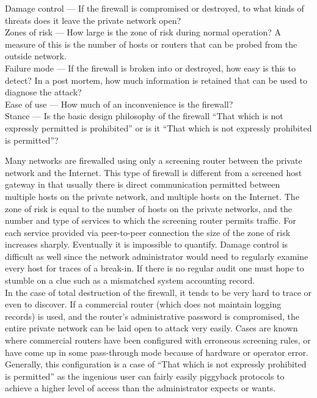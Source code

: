 \begin{htmllist}
\begin{htmllist}
    Damage control --- If the firewall is compromised or destroyed, to what
    kinds of threats does it leave the private network open?\\
    
    Zones of risk --- How large is the zone of risk during normal
    operation?  A measure of this is the number of hosts or routers that
    can be probed
    from the outside network.\\

    Failure mode --- If the firewall is broken into or destroyed, how easy
    is this to detect? In a post mortem, how much information is retained
    that can be used to diagnose the attack?\\

    Ease of use --- How much of an inconvenience is the firewall?\\
    
    Stance --- Is the basic design philosophy of the firewall ``That which
    is not expressly permitted is prohibited'' or is it ``That which is not
    expressly prohibited is permitted''?
  \end{htmllist}

    \label{scr_rout}
    
    Many networks are firewalled using only a screening router between the
    private network and the Internet. This type of firewall is different
    from a screened host gateway in that usually there is direct
    communication permitted between multiple hosts on the private network,
    and multiple hosts on the Internet. The zone of risk is equal to the
    number of hosts on the private networks, and the number and type of
    services to which the screening router permits traffic. For each
    service provided via peer-to-peer connection the size of the zone of
    risk increases sharply. Eventually it is impossible to quantify. Damage
    control is difficult as well since the network administrator would need
    to regularly examine every host for traces of a break-in. If there is
    no regular audit one must hope to stumble on a clue such as a
    mismatched system accounting record.\\
    
    In the case of total destruction of the firewall, it tends to be very
    hard to trace or even to discover. If a commercial router (which does
    not maintain logging records) is used, and the router's administrative
    password is compromised, the entire private network can be laid open to
    attack very easily. Cases are known where commercial routers have been
    configured with erroneous screening rules, or have come up in some
    pass-through mode because of hardware or operator error. Generally,
    this configuration is a case of ``That which is not expressly
    prohibited is permitted'' as the ingenious user can fairly easily
    piggyback protocols to achieve a higher level of access than the
    administrator expects or wants.\\
    

\end{htmllist}
